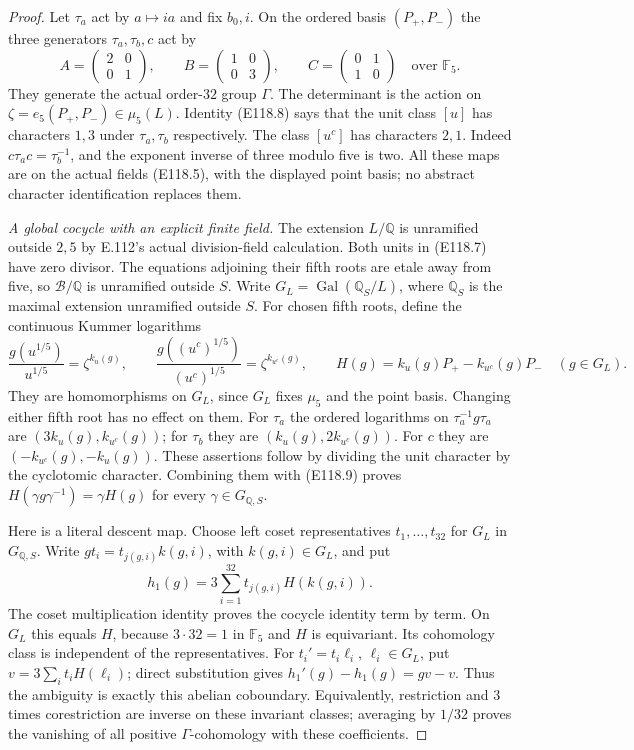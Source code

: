 \begin{proof}
Let $\tau_a$ act by $a\mapsto ia$ and fix $b_0,i$.
On the ordered basis $(P_+,P_-)$ the three generators
$\tau_a,\tau_b,c$ act by
\[
 A=\begin{pmatrix}2&0\\0&1\end{pmatrix},\qquad
 B=\begin{pmatrix}1&0\\0&3\end{pmatrix},\qquad
 C=\begin{pmatrix}0&1\\1&0\end{pmatrix}
                    \quad\text{over }\mathbb F_5.
 \tag{E118.9}
\]
They generate the actual order-$32$ group $\Gamma$.
The determinant is the action on
$\zeta=e_5(P_+,P_-)\in\mu_5(L)$.
Identity (E118.8) says that the unit class $[u]$ has
characters $1,3$ under $\tau_a,\tau_b$ respectively.
The class $[u^c]$ has characters $2,1$.
Indeed $c\tau_a c=\tau_b^{-1}$, and the exponent
inverse of three modulo five is two. All these maps
are on the actual fields (E118.5), with the displayed
point basis; no abstract character identification replaces them.

\emph{A global cocycle with an explicit finite field.}
The extension $L/\mathbb Q$ is unramified outside $2,5$
by E.112's actual division-field calculation. Both units
in (E118.7) have zero divisor. The equations adjoining
their fifth roots are etale away from five, so
$\mathcal B/\mathbb Q$ is unramified outside $S$.
Write $G_L=\operatorname{Gal}(\mathbb Q_S/L)$, where
$\mathbb Q_S$ is the maximal extension unramified outside $S$.
For chosen fifth roots, define the continuous Kummer logarithms
\[
 \frac{g(u^{1/5})}{u^{1/5}}=\zeta^{k_u(g)},\qquad
 \frac{g((u^c)^{1/5})}{(u^c)^{1/5}}=\zeta^{k_{u^c}(g)},
 \qquad
 H(g)=k_u(g)P_+-k_{u^c}(g)P_-\quad(g\in G_L).
 \tag{E118.10}
\]
They are homomorphisms on $G_L$, since $G_L$ fixes $\mu_5$
and the point basis. Changing either fifth root has no
effect on them. For $\tau_a$ the ordered logarithms on
$\tau_a^{-1}g\tau_a$ are $(3k_u(g),k_{u^c}(g))$;
for $\tau_b$ they are $(k_u(g),2k_{u^c}(g))$.
For $c$ they are $(-k_{u^c}(g),-k_u(g))$.
These assertions follow by dividing the unit character
by the cyclotomic character. Combining them with
(E118.9) proves $H(\gamma g\gamma^{-1})=\gamma H(g)$
for every $\gamma\in G_{\mathbb Q,S}$.

Here is a literal descent map. Choose left coset
representatives $t_1,\ldots,t_{32}$ for $G_L$ in
$G_{\mathbb Q,S}$. Write $gt_i=t_{j(g,i)}k(g,i)$,
with $k(g,i)\in G_L$, and put
\[
 h_1(g)=3\sum_{i=1}^{32}t_{j(g,i)}H(k(g,i)).
 \tag{E118.11}
\]
The coset multiplication identity proves the cocycle
identity term by term. On $G_L$ this equals $H$, because
$3\cdot32=1$ in $\mathbb F_5$ and $H$ is equivariant.
Its cohomology class is independent of the representatives.
For $t_i'=t_i\ell_i$, $\ell_i\in G_L$, put
$v=3\sum_i t_iH(\ell_i)$; direct substitution gives
$h_1'(g)-h_1(g)=gv-v$. Thus the ambiguity is exactly
this abelian coboundary. Equivalently, restriction and $3$ times
corestriction are inverse on these invariant classes;
averaging by $1/32$ proves the vanishing of all positive
$\Gamma$-cohomology with these coefficients.


\end{proof}
